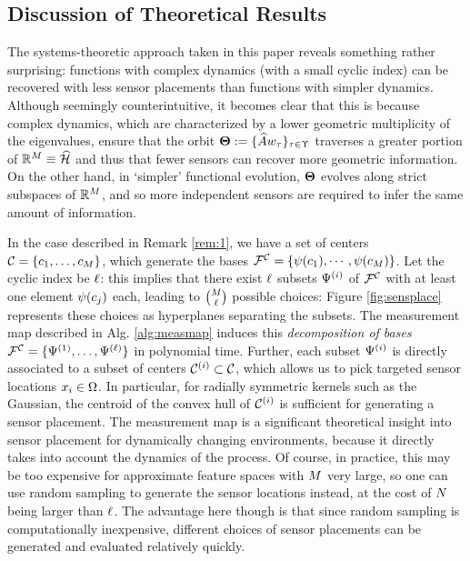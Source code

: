 \subsection{Discussion of Theoretical Results}\label{sec:discussion}
The systems-theoretic approach taken in this paper reveals something rather surprising: functions with complex dynamics (with a small cyclic index) can be recovered with less sensor placements than functions with simpler dynamics. Although seemingly counterintuitive, it becomes clear that this is because complex dynamics, which are characterized by a lower geometric multiplicity of the eigenvalues, ensure that the orbit $\boldsymbol{\Theta} := \{\widehat{A}w_{\tau}\}_{\tau\in\Upsilon}$ traverses a greater portion of $\mathbb{R}^{M} \equiv \widehat{\mathcal{H}}$ and thus that fewer sensors can recover more geometric information. On the other hand, in `simpler' functional evolution, $\boldsymbol{\Theta}$ evolves along strict subspaces of $\mathbb{R}^{M}$, and so more independent sensors are required to infer the same amount of information. 

In the case described in Remark \ref{rem:1}, we have a set of centers $\mathcal{C}=\{c_1,\dots,c_{M}\}$, which generate the bases $\mathcal{F}^{\mathcal{C}} = \{\psi(c_1), \cdots , \psi(c_{M})\}$. Let the cyclic index be $\ell$: this implies that there exist $\ell$ subsets $\Psi^{(i)}$ of $\mathcal{F}^{\mathcal{C}}$ with at least one element $\psi(c_j)$ each, leading to $\binom{M}{\ell}$ possible choices: Figure \ref{fig:sensplace} represents these choices as hyperplanes separating the subsets. 
The measurement map described in Alg. \ref{alg:measmap} induces this \emph{decomposition of bases} $\mathcal{F}^{\mathcal{C}} = \{\Psi^{(1)},\dots,\Psi^{(\ell)}\}$ in polynomial time. Further, each subset $\Psi^{(i)}$ is directly associated to a subset of centers $\mathcal{C}^{(i)}\subset\mathcal{C}$, which allows us to pick targeted sensor locations $x_i\in\Omega$. In particular, for radially symmetric kernels such as the Gaussian, the centroid of the convex hull of $\mathcal{C}^{(i)}$ is sufficient for generating a sensor placement. The measurement map is a significant theoretical insight into sensor placement for dynamically changing environments, because it directly takes into account the dynamics of the process. Of course, in practice, this may be too expensive for approximate feature spaces with $M$ very large, so one can use random sampling to generate the sensor locations instead, at the cost of $N$ being larger than $\ell$. The advantage here though is that since random sampling is computationally inexpensive, different choices of sensor placements can be generated and evaluated relatively quickly.

